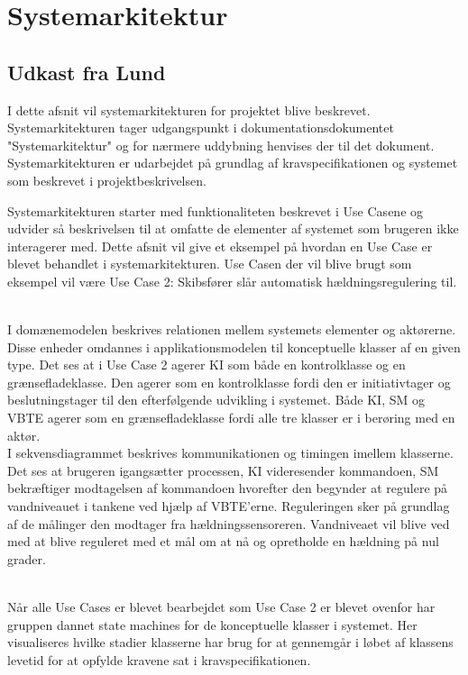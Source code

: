\section{Systemarkitektur}
\subsection{Udkast fra Lund}
I dette afsnit vil systemarkitekturen for projektet blive beskrevet. Systemarkitekturen tager udgangspunkt i dokumentationsdokumentet "Systemarkitektur" og for nærmere uddybning henvises der til det dokument. 
Systemarkitekturen er udarbejdet på grundlag af kravspecifikationen og systemet som beskrevet i projektbeskrivelsen.

Systemarkitekturen starter med funktionaliteten beskrevet i Use Casene og udvider så beskrivelsen til at omfatte de elementer af systemet som brugeren ikke interagerer med. Dette afsnit vil give et eksempel på hvordan en Use Case er blevet behandlet i systemarkitekturen. Use Casen der vil blive brugt som eksempel vil være Use Case 2: Skibsfører slår automatisk hældningsregulering til.

\\
I domænemodelen beskrives relationen mellem systemets elementer og aktørerne. Disse enheder omdannes i applikationsmodelen til konceptuelle klasser af en given type. Det ses at i Use Case 2 agerer KI som både en kontrolklasse og en grænsefladeklasse. Den agerer som en kontrolklasse fordi den er initiativtager og beslutningstager til den efterfølgende udvikling i systemet. Både KI, SM og VBTE agerer som en grænsefladeklasse fordi alle tre klasser er i berøring med en aktør.\\
I sekvensdiagrammet beskrives kommunikationen og timingen imellem klasserne. Det ses at brugeren igangsætter processen, KI videresender kommandoen, SM bekræftiger modtagelsen af kommandoen hvorefter den begynder at regulere på vandniveauet i tankene ved hjælp af VBTE'erne. Reguleringen sker på grundlag af de målinger den modtager fra hældningssensoreren. Vandniveaet vil blive ved med at blive reguleret med et mål om at nå og opretholde en hældning på nul grader.

\\
Når alle Use Cases er blevet bearbejdet som Use Case 2 er blevet ovenfor har gruppen dannet state machines for de konceptuelle klasser i systemet. Her visualiseres hvilke stadier klasserne har brug for at gennemgår i løbet af klassens levetid for at opfylde kravene sat i kravspecifikationen.

